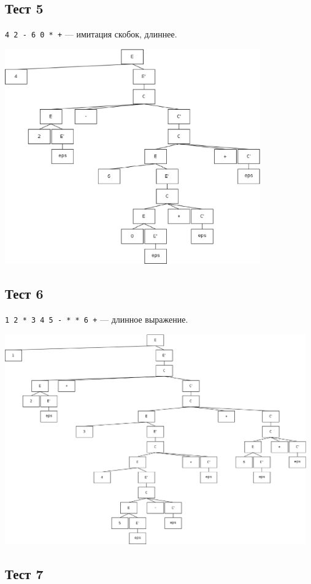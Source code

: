 \subsection{Тест 5}

\texttt{4 2 - 6 0 * +} --- имитация скобок, длиннее.

\includegraphics[width=110mm]{test5.eps} 

\subsection{Тест 6}

\texttt{1 2 * 3 4 5 - * * 6 +} --- длинное выражение.

\includegraphics[width=130mm]{test6.eps} 

\subsection{Тест 7}

